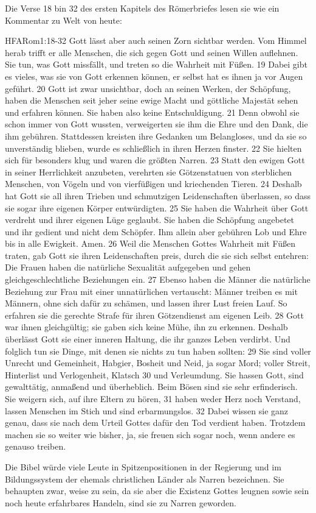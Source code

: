 \documentclass{../inc/mybibbook}
\begin{document}
Die Verse 18 bin 32 des ersten Kapitels des Römerbriefes lesen sie wie ein Kommentar zu Welt von heute:
\begin{bibelbox}{HFA}{Rom}{1:18-32}
    Gott lässt aber auch seinen Zorn sichtbar werden. Vom Himmel herab trifft er alle Menschen, die sich gegen Gott und seinen Willen auflehnen. Sie tun, was Gott missfällt, und treten so die Wahrheit mit Füßen. 19 Dabei gibt es vieles, was sie von Gott erkennen können, er selbst hat es ihnen ja vor Augen geführt. 20 Gott ist zwar unsichtbar, doch an seinen Werken, der Schöpfung, haben die Menschen seit jeher seine ewige Macht und göttliche Majestät sehen und erfahren können. Sie haben also keine Entschuldigung. 21 Denn obwohl sie schon immer von Gott wussten, verweigerten sie ihm die Ehre und den Dank, die ihm gebühren. Stattdessen kreisten ihre Gedanken um Belangloses, und da sie so unverständig blieben, wurde es schließlich in ihren Herzen finster. 22 Sie hielten sich für besonders klug und waren die größten Narren. 23 Statt den ewigen Gott in seiner Herrlichkeit anzubeten, verehrten sie Götzenstatuen von sterblichen Menschen, von Vögeln und von vierfüßigen und kriechenden Tieren. 24 Deshalb hat Gott sie all ihren Trieben und schmutzigen Leidenschaften überlassen, so dass sie sogar ihre eigenen Körper entwürdigten. 25 Sie haben die Wahrheit über Gott verdreht und ihrer eigenen Lüge geglaubt. Sie haben die Schöpfung angebetet und ihr gedient und nicht dem Schöpfer. Ihm allein aber gebühren Lob und Ehre bis in alle Ewigkeit. Amen. 26 Weil die Menschen Gottes Wahrheit mit Füßen traten, gab Gott sie ihren Leidenschaften preis, durch die sie sich selbst entehren: Die Frauen haben die natürliche Sexualität aufgegeben und gehen gleichgeschlechtliche Beziehungen ein. 27 Ebenso haben die Männer die natürliche Beziehung zur Frau mit einer unnatürlichen vertauscht: Männer treiben es mit Männern, ohne sich dafür zu schämen, und lassen ihrer Lust freien Lauf. So erfahren sie die gerechte Strafe für ihren Götzendienst am eigenen Leib. 28 Gott war ihnen gleichgültig; sie gaben sich keine Mühe, ihn zu erkennen. Deshalb überlässt Gott sie einer inneren Haltung, die ihr ganzes Leben verdirbt. Und folglich tun sie Dinge, mit denen sie nichts zu tun haben sollten: 29 Sie sind voller Unrecht und Gemeinheit, Habgier, Bosheit und Neid, ja sogar Mord; voller Streit, Hinterlist und Verlogenheit, Klatsch 30 und Verleumdung. Sie hassen Gott, sind gewalttätig, anmaßend und überheblich. Beim Bösen sind sie sehr erfinderisch. Sie weigern sich, auf ihre Eltern zu hören, 31 haben weder Herz noch Verstand, lassen Menschen im Stich und sind erbarmungslos. 32 Dabei wissen sie ganz genau, dass sie nach dem Urteil Gottes dafür den Tod verdient haben. Trotzdem machen sie so weiter wie bisher, ja, sie freuen sich sogar noch, wenn andere es genauso treiben.
\end{bibelbox}
Die Bibel würde viele Leute in Spitzenpositionen in der Regierung und im Bildungssystem der ehemals christlichen Länder als \flqq Narren\frqq{} bezeichnen. Sie behaupten zwar, weise zu sein, da sie aber die Existenz Gottes leugnen sowie sein noch heute erfahrbares Handeln, \flqq sind sie zu Narren geworden\frqq.
\end{document}
